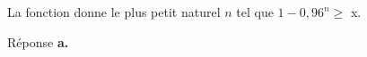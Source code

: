 \begin{enumerate}
\begin{enumerate}[resume]
%
La fonction donne le plus petit naturel $n$ tel que $1 - 0,96^n \geqslant $ x.

Réponse \textbf{a.}
	\end{enumerate}
\end{enumerate}






